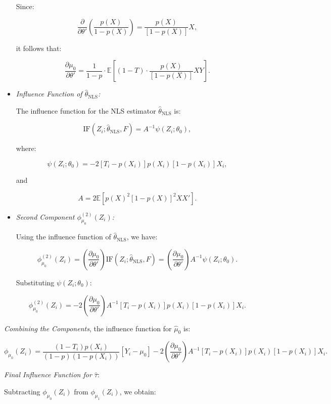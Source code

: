 \documentclass{article}
\begin{document}
\begin{itemize}
    Since:

    \[
    \frac{\partial}{\partial \theta'}\left( \frac{p(X)}{1 - p(X)} \right) = \frac{p(X)}{[1 - p(X)]} X,
    \]

    it follows that:

    \[
    \frac{\partial \mu_0}{\partial \theta'} = \frac{1}{1 - p} \cdot \mathbb{E}\left[ (1 - T) \cdot \frac{p(X)}{[1 - p(X)]} X Y \right].
    \]

    \item \textit{Influence Function of \( \hat{\theta}_{\text{NLS}} \):}

    The influence function for the NLS estimator \( \hat{\theta}_{\text{NLS}} \) is:

    \[
    \text{IF}(Z_i; \hat{\theta}_{\text{NLS}}, F) = A^{-1} \psi(Z_i; \theta_0),
    \]

    where:

    \[
    \psi(Z_i; \theta_0) = -2 [T_i - p(X_i)] p(X_i) [1 - p(X_i)] X_i,
    \]

    and

    \[
    A = 2 \mathbb{E}\left[ p(X)^2 [1 - p(X)]^2 X X' \right].
    \]

    \item \textit{Second Component \( \phi_{\mu_0}^{(2)}(Z_i) \):}

    Using the influence function of \( \hat{\theta}_{\text{NLS}} \), we have:

    \[
    \phi_{\mu_0}^{(2)}(Z_i) = \left( \frac{\partial \mu_0}{\partial \theta'} \right) \text{IF}(Z_i; \hat{\theta}_{\text{NLS}}, F) = \left( \frac{\partial \mu_0}{\partial \theta'} \right) A^{-1} \psi(Z_i; \theta_0).
    \]

    Substituting \( \psi(Z_i; \theta_0) \):

    \[
    \phi_{\mu_0}^{(2)}(Z_i) = -2 \left( \frac{\partial \mu_0}{\partial \theta'} \right) A^{-1} [T_i - p(X_i)] p(X_i) [1 - p(X_i)] X_i.
    \]

\end{itemize}

\textit{Combining the Components}, the influence function for \( \hat{\mu}_0 \) is:

\[
\phi_{\mu_0}(Z_i) = \frac{(1 - T_i) p(X_i)}{(1 - p)(1 - p(X_i))} [Y_i - \mu_0] - 2 \left( \frac{\partial \mu_0}{\partial \theta'} \right) A^{-1} [T_i - p(X_i)] p(X_i) [1 - p(X_i)] X_i.
\]

\textit{Final Influence Function for \( \hat{\tau} \)}:

Subtracting \( \phi_{\mu_0}(Z_i) \) from \( \phi_{\mu_1}(Z_i) \), we obtain:
\end{document}
